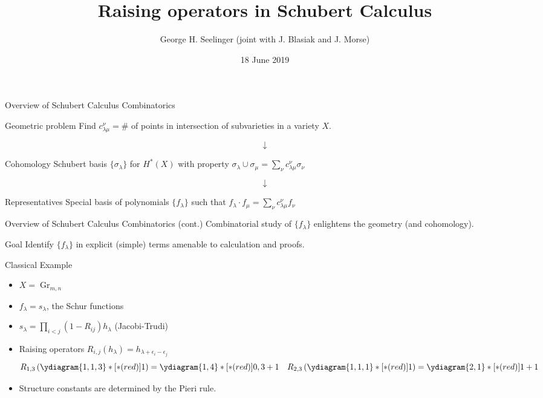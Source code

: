 \documentclass{beamer}
\title[Raising operators in Schubert Calculus]{Raising operators in Schubert Calculus} %
\author[George H. Seelinger]{George H. Seelinger (joint with
  J. Blasiak and J. Morse)} %
\institute[UVA] %
{
GarsiaFest 2019 \\ %
\medskip
\textit{ghs9ae@virginia.edu} %
}
\date{18 June 2019} %
\DeclareMathOperator{\Gr}{Gr}
\newcommand{\cupprod}{\cup}
\begin{document}
\begin{frame}
\titlepage %
\end{frame}
\begin{frame}{Overview of Schubert Calculus Combinatorics}
  \begin{block}{Geometric problem}
    Find \(c_{\lambda \mu}^\nu = \#\) of points in
    intersection of subvarieties in a variety \(X\). \pause
  \end{block}
  \[
    \downarrow
  \]
  \begin{block}{Cohomology}
    Schubert basis \(\{\sigma_\lambda\}\) for \(H^*(X)\) with property \(\sigma_\lambda \cupprod \sigma_\mu = \sum_\nu c_{\lambda \mu}^\nu \sigma_\nu\) \pause 
\end{block}
\[
  \downarrow
\]
\begin{block}{Representatives}
  Special basis of polynomials \(\{f_\lambda\}\) such that \(f_\lambda \cdot f_\mu = \sum_\nu c_{\lambda \mu}^\nu f_\nu\)
\end{block}
\end{frame}
\begin{frame}{Overview of Schubert Calculus Combinatorics (cont.)}
  Combinatorial study of \(\{f_\lambda\}\) enlightens the geometry
  (and cohomology). \pause
  \begin{alertblock}{Goal}
    Identify \(\{f_\lambda\}\) in explicit (simple) terms amenable to
    calculation and proofs.
  \end{alertblock}
\end{frame}
\begin{frame}{Classical Example}
  \begin{example}
    \begin{itemize}
    \item \(X = \Gr_{m,n}\) \pause
    \item \(f_\lambda = s_\lambda\), the Schur functions \pause
    \item \(s_\lambda = \prod_{i < j} (1-R_{ij})h_\lambda\)
      (Jacobi-Trudi) \pause
      \item Raising operators
    \(R_{i,j}(h_\lambda) = h_{\lambda+\epsilon_i-\epsilon_j}\)
    \[
      R_{1,3} \left( \ydiagram{1,1,3}*[*(red)]{1} \right) =
      \ydiagram{1,4}*[*(red)]{0,3+1} \ \ \ R_{2,3} \left(
        \ydiagram{1,1,1}*[*(red)]{1} \right) =
      \ydiagram{2,1}*[*(red)]{1+1}
    \] \pause
    \item Structure constants are determined by the Pieri rule. 
    \end{itemize}
  \end{example}
\end{frame}
\end{document}
